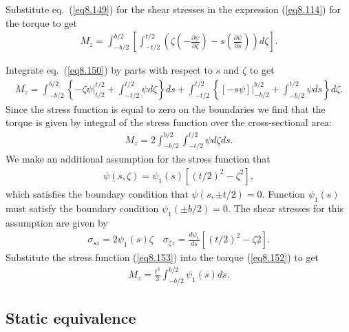 \documentclass{AeroStructure-ERJohnson}
\begin{document}
Substitute eq.~(\ref{eq8.149}) for the shear stresses in the
expression (\ref{eq8.114}) for the torque to get
\begin{align}\label{eq8.150}
M_{z}=\int_{-b/ 2}^{b/ 2}\left[\int_{-t/ 2}^{t/
2}\left(\zeta\left(-\frac{\partial \psi}{\partial
\zeta}\right)-s\left(\frac{\partial \psi}{\partial
s}\right)\right) d \zeta\right].
\end{align}
\vspace*{2pt}
\clearpage

\noindent Integrate eq.~(\ref{eq8.150}) by parts with respect to $s$ and $\zeta$ to get
\begin{align}\label{eq8.151}
M_{z}=\int_{-b/ 2}^{b/ 2}\left\{-\left.\zeta \psi\right|_{t/ 2}
^{t/ 2}+\int_{-t/ 2}^{t/ 2} \psi d \zeta\right\} d s+\int_{-t/
2}^{t/ 2}\left\{\left.[-s \psi]\right|_{-b/ 2} ^{b/ 2}+\int_{-b
/ 2}^{t/ 2} \psi d s\right\} d \zeta.
\end{align}
Since the stress function is equal to zero on the boundaries we
find that the torque is given by integral of the stress function
over the cross-sectional area:
\begin{align}\label{eq8.152}
M_{z}=2 \int_{-b/ 2}^{b/ 2} \int_{-t/ 2}^{t/ 2} \psi d \zeta d
s.
\end{align}
We make an additional assumption for the stress function that
\begin{align}\label{eq8.153}
\psi(s, \zeta)=\psi_{1}(s)\left[(t/ 2)^{2}-\zeta^{2}\right],
\end{align}
which satisfies the boundary condition that $\psi(s, \pm t/
2)=0$. Function $\psi_{1}(s)$ must satisfy the boundary condition
$\psi_{1}(\pm b/ 2)=0$. The shear stresses for this assumption
are given by
\begin{align}\label{eq8.154}
\sigma_{s z}=2 \psi_{1}(s) \zeta \quad \sigma_{\zeta z}=\frac{d
\psi_{1}}{d s}\left[(t/ 2)^{2}-\zeta 2\right].
\end{align}
Substitute the stress function (\ref{eq8.153}) into the torque
(\ref{eq8.152}) to get
\begin{align}\label{eq8.155}
M_{z}=\frac{t^{3}}{3} \int_{-b/ 2}^{b/ 2} \psi_{1}(s) d s.
\end{align}

\subsection{Static equivalence}\label{sec8.4.3}
\end{document}
